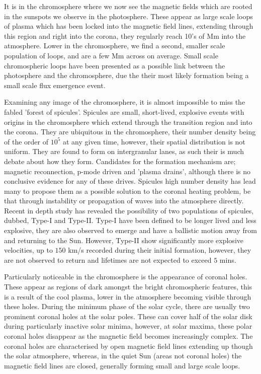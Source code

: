 It is in the chromosphere where we now see the magnetic fields which are rooted in the sunspots we observe in the photosphere.
These appear as large scale loops of plasma which has been locked into the magnetic field lines, extending through this region and right into the corona, they regularly reach 10's of Mm into the atmosphere.
Lower in the chromosphere, we find a second, smaller scale population of loops, and are a few Mm across on average.
Small scale chromospheric loops have been presented as a possible link between the photosphere and the chromosphere, due the their most likely formation being a small scale flux emergence event.

Examining any image of the chromosphere, it is almost impossible to miss the fabled 'forest of spicules'.
Spicules are small, short-lived, explosive events with origins in the chromosphere which extend through the transition region and into the corona.
They are ubiquitous in the chromosphere, their number density being of the order of $10^5$ at any given time, however, their spatial distribution is not uniform.
They are found to form on intergranular lanes, as such their is much debate about how they form.
Candidates for the formation mechanism are; magnetic reconnection, p-mode driven and 'plasma drains', although there is no conclusive evidence for any of these drives.
Spicules high number density has lead many to propose them as a possible solution to the coronal heating problem, be that through instability or propagation of waves into the atmosphere directly.
Recent in depth study has revealed the possibility of two populations of spicules, dubbed, Type-I and Type-II.
Type-I have been defined to be longer lived and less explosive, they are also observed to emerge and have a ballistic motion away from and returning to the Sun.
However, Type-II show significantly more explosive velocities, up to $150$ km/s recorded during their initial formation, however, they are not observed to return and lifetimes are not expected to exceed $5$ mins. 

Particularly noticeable in the chromosphere is the appearance of coronal holes.
These appear as regions of dark amongst the bright chromospheric features, this is a result of the cool plasma, lower in the atmosphere becoming visible through these holes.
During the minimum phase of the solar cycle, there are usually two prominent coronal holes at the solar poles. 
These can cover half of the solar disk during particularly inactive solar minima, however, at solar maxima, these polar coronal holes disappear as the magnetic field becomes increasingly complex.
The coronal holes are characterised by open magnetic field lines extending up though the solar atmosphere, whereas, in the quiet Sun (areas not coronal holes) the magnetic field lines are closed, generally forming small and large scale loops.

